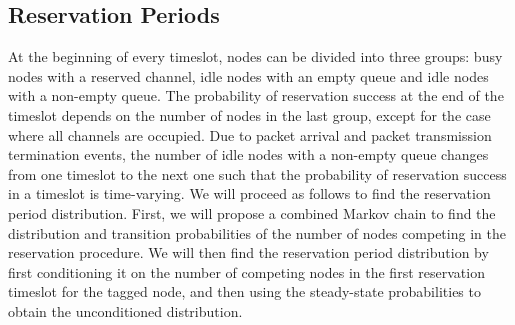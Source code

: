 \documentclass[12pt,journal,oneside,onecolumn]{IEEEtran}
\begin{document}
\subsection{Reservation Periods}
\label{sec:xr}
At the beginning of every timeslot, nodes can be divided into three groups: 
busy nodes with a reserved channel, idle nodes with an empty queue 
and idle nodes with a non-empty queue. The probability of reservation success at the end of the timeslot 
depends on the number of nodes in the last group, except for the case where all channels are occupied. 
Due to packet arrival and packet transmission termination events, the number of idle nodes with a non-empty
queue changes from one timeslot to the next one such that the probability of 
reservation success in a timeslot is time-varying.
We will proceed as follows to find the reservation period distribution. First, we will propose a combined Markov chain to find 
the distribution and transition probabilities 
of the number of nodes competing in the reservation procedure. We will then find the reservation period distribution by first conditioning it 
on the number of competing nodes in the first reservation timeslot for the tagged node, and then using the steady-state probabilities to
obtain the unconditioned distribution.   
\end{document}
